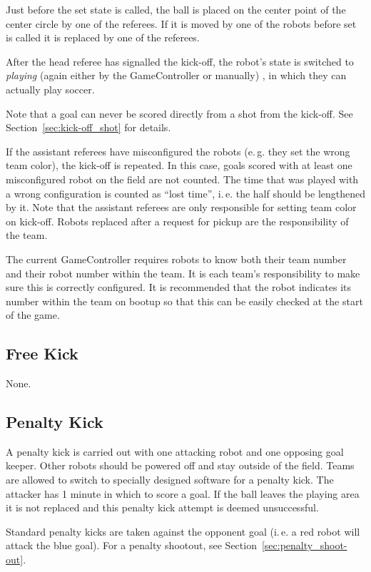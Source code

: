 \documentclass[12pt]{article}
\newcommand{\ie}{\mbox{i.\,e.}\xspace}
\newcommand{\eg}{\mbox{e.\,g.}\xspace}
\begin{document}
Just before the set state is called, the ball is placed on the
center point of the center circle by one of the referees.  If it
is moved by one of the robots before set is called it is replaced
by one of the referees.

After the head referee has signalled the kick-off, the robot's state
is switched to \emph{playing} (again either by the GameController or manually)
, in which they can actually play soccer.

Note that a goal can never be scored directly from a shot from the
kick-off. See Section~\ref{sec:kick-off_shot} for details.

If the assistant referees have misconfigured the robots (\eg they
set the wrong team color), the kick-off is repeated. In this case,
goals scored with at least one misconfigured robot on the field are
not counted. The time that was played with a wrong configuration is
counted as ``lost time'', \ie the half should be lengthened by it.
Note that the assistant referees are only responsible for setting team
color on kick-off.  Robots replaced after a request for pickup are
the responsibility of the team.

The current GameController requires robots to know both their team number
and their robot number within the team.  It is each team's responsibility
to make sure this is correctly configured.  It is recommended that the
robot indicates its number within the team on bootup so that this can
be easily checked at the start of the game. %

\subsection{Free Kick}
None.

\subsection{Penalty Kick}
\label{sec:penalty_kick}

A penalty kick is carried out with one attacking robot and one
opposing goal keeper. Other robots should be powered off and stay outside of the
field. Teams are allowed to switch to specially designed software
for a penalty kick. The attacker has 1 minute in which to score a
goal. If the ball leaves the playing area it is not replaced and
this penalty kick attempt is deemed unsuccessful.

Standard penalty kicks are taken against the opponent goal (\ie a
red robot will attack the blue goal). For a penalty shootout, see
Section~\ref{sec:penalty_shoot-out}.
\end{document}
